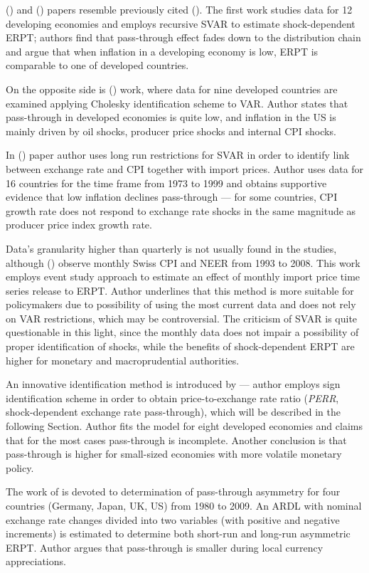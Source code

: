 \documentclass[12pt, a4paper]{extarticle}
\begin{document}
(\cite{CaZorzi2007}) and (\cite{McCarthy2007}) papers resemble previously cited (\cite{Hahn2003}). The first work studies data for 12 developing economies and employs recursive SVAR to estimate shock-dependent ERPT; authors find that pass-through effect fades down to the distribution chain and argue that when inflation in a developing economy is low, ERPT is comparable to one of developed countries.

On the opposite side is (\cite{McCarthy2007}) work, where data for nine developed countries are examined applying Cholesky identification scheme to VAR. Author states that pass-through in developed economies is quite low, and inflation in the US is mainly driven by oil shocks, producer price shocks and internal CPI shocks.

In (\cite{Shambaugh2008}) paper author uses long run restrictions for SVAR in order to identify link between exchange rate and CPI together with import prices. Author uses data for 16 countries for the time frame from 1973 to 1999 and obtains supportive evidence that low inflation declines pass-through --- for some countries, CPI growth rate does not respond to exchange rate shocks in the same magnitude as producer price index growth rate.

Data's granularity higher than quarterly is not usually found in the studies, although (\cite{Amstad2010}) observe monthly Swiss CPI and NEER from 1993 to 2008. This work employs event study approach to estimate an effect of monthly import price time series release to ERPT. Author underlines that this method is more suitable for policymakers due to possibility of using the most current data and does not rely on VAR restrictions, which may be controversial. The criticism of SVAR is quite questionable in this light, since the monthly data does not impair a possibility of proper identification of shocks, while the benefits of shock-dependent ERPT are higher for monetary and macroprudential authorities.

An innovative identification method is introduced by \textcite{An2012} --- author employs sign identification scheme in order to obtain price-to-exchange rate ratio (\textit{PERR}, shock-dependent exchange rate pass-through), which will be described in the following Section. Author fits the model for eight developed economies and claims that for the most cases pass-through is incomplete. Another conclusion is that pass-through is higher for small-sized economies with more volatile monetary policy.

The work of \textcite{Delatte2012} is devoted to determination of pass-through asymmetry for four countries (Germany, Japan, UK, US) from 1980 to 2009. An ARDL with nominal exchange rate changes divided into two variables (with positive and negative increments) is estimated to determine both short-run and long-run asymmetric ERPT. Author argues that pass-through is smaller during local currency appreciations.
\end{document}
